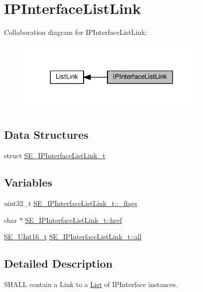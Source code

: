 \hypertarget{group__IPInterfaceListLink}{}\section{I\+P\+Interface\+List\+Link}
\label{group__IPInterfaceListLink}
Collaboration diagram for I\+P\+Interface\+List\+Link\+:\nopagebreak
\begin{figure}[H]
\begin{center}
\leavevmode
\includegraphics[width=264pt]{group__IPInterfaceListLink}
\end{center}
\end{figure}
\subsection*{Data Structures}
\begin{DoxyCompactItemize}
\item 
struct \hyperlink{structSE__IPInterfaceListLink__t}{S\+E\+\_\+\+I\+P\+Interface\+List\+Link\+\_\+t}
\end{DoxyCompactItemize}
\subsection*{Variables}
\begin{DoxyCompactItemize}
\item 
uint32\+\_\+t \hyperlink{group__IPInterfaceListLink_gadec76351c50ca25f3c436f8a5c034110}{S\+E\+\_\+\+I\+P\+Interface\+List\+Link\+\_\+t\+::\+\_\+flags}
\item 
char $\ast$ \hyperlink{group__IPInterfaceListLink_ga2e91acf15facca125f3e17b33e429b70}{S\+E\+\_\+\+I\+P\+Interface\+List\+Link\+\_\+t\+::href}
\item 
\hyperlink{group__UInt16_gac68d541f189538bfd30cfaa712d20d29}{S\+E\+\_\+\+U\+Int16\+\_\+t} \hyperlink{group__IPInterfaceListLink_ga4f3744f432c05a0c9abe6120b6661fc6}{S\+E\+\_\+\+I\+P\+Interface\+List\+Link\+\_\+t\+::all}
\end{DoxyCompactItemize}


\subsection{Detailed Description}
S\+H\+A\+LL contain a Link to a \hyperlink{structList}{List} of I\+P\+Interface instances. 

